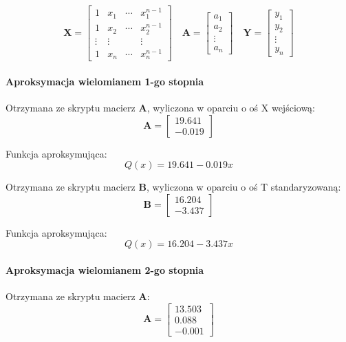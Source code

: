 \documentclass[a4paper, 12pt]{mwart}
\begin{document}
				$$ \textbf{X} = \begin{bmatrix}
					1      & x_1    & \cdots & x_1^{n-1} \\
					1      & x_2    & \cdots & x_2^{n-1} \\
					\vdots & \vdots &        & \vdots\\ 
					1      & x_n    & \cdots & x_n^{n-1}
				\end{bmatrix} 
				\quad 
				\textbf{A} = \begin{bmatrix}
					a_1\\
					a_2\\
					\vdots\\
					a_n
				\end{bmatrix} \quad
				\textbf{Y} = \begin{bmatrix}
					y_1\\
					y_2\\
					\vdots\\
					y_n
				\end{bmatrix}$$

				\newpage
				\paragraph{Aproksymacja wielomianem 1-go stopnia}

					Otrzymana ze skryptu macierz $\textbf{A}$, wyliczona w oparciu o oś X wejściową:
					$$ \textbf{A} = \begin{bmatrix}
						19.641\\
						-0.019
					\end{bmatrix} $$

					Funkcja aproksymująca:
					$$ Q(x) = 19.641 - 0.019x $$

					Otrzymana ze skryptu macierz $\textbf{B}$, wyliczona w oparciu o
					oś T standaryzowaną:
					$$ \textbf{B} = \begin{bmatrix}
						16.204\\
						-3.437
					\end{bmatrix} $$

					Funkcja aproksymująca:
					$$ Q(x) = 16.204 - 3.437x$$

				\paragraph{Aproksymacja wielomianem 2-go stopnia}

					Otrzymana ze skryptu macierz $\textbf{A}$:
					$$\textbf{A} = \begin{bmatrix}
						13.503\\
						0.088\\
						-0.001
					\end{bmatrix}$$
					
\end{document}
